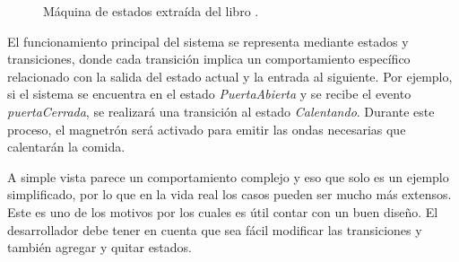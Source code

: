\begin{figure}[h]
\caption{Máquina de estados extraída del libro \cite{douglass}.}
\label{maquinaMicroondas}
\begin{center}
\end{center}
\end{figure}

El funcionamiento principal del sistema se representa mediante estados y transiciones, donde cada transición implica un comportamiento específico relacionado con la salida del estado actual y la entrada al siguiente. Por ejemplo, si el sistema se encuentra en el estado \textit{PuertaAbierta} y se recibe el evento \textit{puertaCerrada}, se realizará una transición al estado \textit{Calentando}. Durante este proceso, el magnetrón será activado para emitir las ondas necesarias que calentarán la comida.

A simple vista parece un comportamiento complejo y eso que solo es un ejemplo simplificado, por lo que en la vida real los casos pueden ser mucho más extensos. Este es uno de los motivos por los cuales es útil contar con un buen diseño. El desarrollador debe tener en cuenta que sea fácil modificar las transiciones y también agregar y quitar estados.

